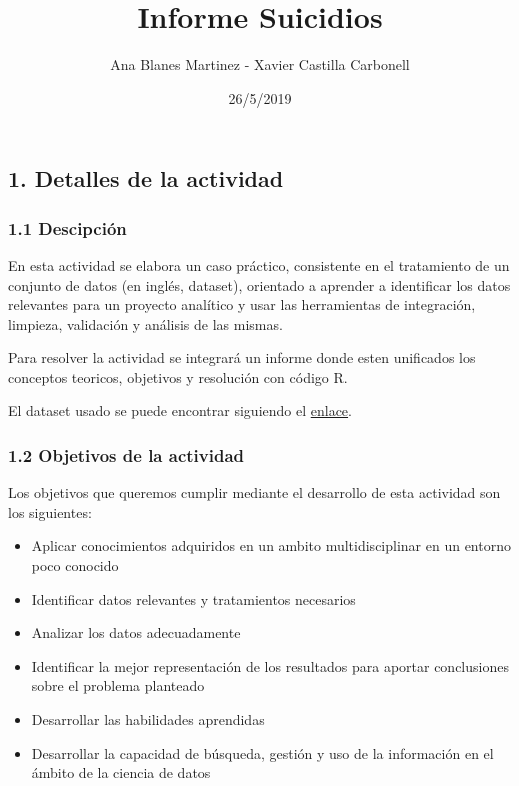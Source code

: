\documentclass[]{article}
\title{Informe Suicidios}
\author{Ana Blanes Martinez - Xavier Castilla Carbonell}
\date{26/5/2019}
\providecommand{\tightlist}{%
  \setlength{\itemsep}{0pt}\setlength{\parskip}{0pt}}
\begin{document}
\maketitle

{
\setcounter{tocdepth}{4}
\tableofcontents
}
\hypertarget{detalles-de-la-actividad}{%
\subsection{1. Detalles de la
actividad}\label{detalles-de-la-actividad}}

\hypertarget{descipcion}{%
\subsubsection{1.1 Descipción}\label{descipcion}}

En esta actividad se elabora un caso práctico, consistente en el
tratamiento de un conjunto de datos (en inglés, dataset), orientado a
aprender a identiﬁcar los datos relevantes para un proyecto analítico y
usar las herramientas de integración, limpieza, validación y análisis de
las mismas.

Para resolver la actividad se integrará un informe donde esten
unificados los conceptos teoricos, objetivos y resolución con código R.

El dataset usado se puede encontrar siguiendo el
\href{https://www.kaggle.com/russellyates88/suicide-rates-overview-1985-to-2016}{enlace}.

\hypertarget{objetivos-de-la-actividad}{%
\subsubsection{1.2 Objetivos de la
actividad}\label{objetivos-de-la-actividad}}

Los objetivos que queremos cumplir mediante el desarrollo de esta
actividad son los siguientes:

\begin{itemize}
\tightlist
\item
  Aplicar conocimientos adquiridos en un ambito multidisciplinar en un
  entorno poco conocido
\item
  Identificar datos relevantes y tratamientos necesarios
\item
  Analizar los datos adecuadamente
\item
  Identificar la mejor representación de los resultados para aportar
  conclusiones sobre el problema planteado
\item
  Desarrollar las habilidades aprendidas
\item
  Desarrollar la capacidad de búsqueda, gestión y uso de la información
  en el ámbito de la ciencia de datos
\end{itemize}
\end{document}
